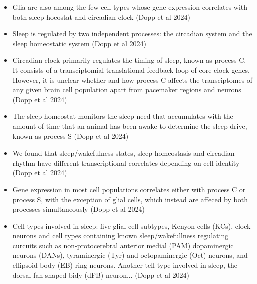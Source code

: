 \documentclass[11pt]{article}
\begin{document}
\begin{itemize}
    \item Glia are also among the few cell types whose gene expression correlates with both sleep hoeostat and circadian clock \parencite{doppSinglecellTranscriptomicsReveals2024}
    (Dopp et al 2024)

    \item Sleep is regulated by two independent processes: the circadian system and the sleep homeostatic system \parencite{doppSinglecellTranscriptomicsReveals2024}
    (Dopp et al 2024)

    \item Circadian clock primarily regulates the timing of sleep, known as process C. It consists of a transciptomial-translational
    feedback loop of core clock genes. However, it is unclear whether and how process C affects the transciptomes of any given brain cell
    population apart from pacemaker regions and neurons \parencite{doppSinglecellTranscriptomicsReveals2024}
    (Dopp et al 2024)

    \item The sleep homeostat monitors the sleep need that accumulates with the amount of time that an animal has been awake
    to determine the sleep drive, known as process S \parencite{doppSinglecellTranscriptomicsReveals2024}
    (Dopp et al 2024)

    \item We found that sleep/wakefulness states, sleep homeostasis and circadian rhythm have different transcriptional correlates depending
    on cell identity \parencite{doppSinglecellTranscriptomicsReveals2024}
    (Dopp et al 2024)

    \item Gene expression in most cell populations correlates either with process C or process S, with the exception of glial cells,
    which instead are affeced by both processes simultaneously \parencite{doppSinglecellTranscriptomicsReveals2024}
    (Dopp et al 2024)

    \item Cell types involved in sleep: five glial cell subtypes, Kenyon cells (KCs), clock neurons and cell types containing
    known sleep/wakefullness regulating curcuits such as non-protocerebral anterior medial (PAM) dopaminergic neurons (DANs),
    tyraminergic (Tyr) and octopaminergic (Oct) neurons, and ellipsoid body (EB) ring neurons. Another tell type involved in sleep,
    the dorsal fan-shaped bidy (dFB) neuron... \parencite{doppSinglecellTranscriptomicsReveals2024}
    (Dopp et al 2024)


\end{itemize}
\end{document}
